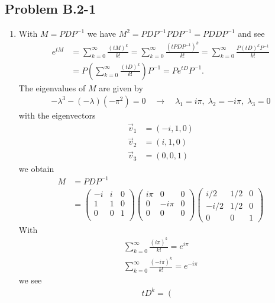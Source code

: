 \documentclass[10pt,a4paper]{book}
\theoremstyle{definition}
\begin{document}
\subsection{Problem B.2-1}
\begin{enumerate}
\item
With $M=PDP^{-1}$ we have $M^2=PDP^{-1}PDP^{-1}=PDDP^{-1}$ and see
\begin{align}
    e^{tM}&=\sum_{k=0}^\infty \frac{(tM)^k}{k!}=\sum_{k=0}^\infty \frac{(tPDP^{-1})^k}{k!}=\sum_{k=0}^\infty \frac{P(tD)^kP^{-1}}{k!}\\
    &=P\left(\sum_{k=0}^\infty \frac{(tD)^k}{k!}\right)P^{-1}=Pe^{tD}P^{-1}.
\end{align}
The eigenvalues of $M$ are given by
\begin{align}
    -\lambda^3-(-\lambda)(-\pi^2)=0\quad\rightarrow\quad\lambda_1=i\pi,\;\lambda_2=-i\pi,\;\lambda_3= 0
\end{align}
with the eigenvectors
\begin{align}
    \vec{v}_1&=(-i,1,0)\\
    \vec{v}_2&=(i,1,0)\\
    \vec{v}_3&=(0,0,1)
\end{align}
we obtain
\begin{align}
M&=PDP^{-1}\\
&=\left(
\begin{array}{ccc}
-i& i & 0 \\
1 & 1 & 0 \\
0 & 0 & 1 \\
\end{array}
\right)
\left(
\begin{array}{ccc}
 i\pi & 0 & 0 \\
 0 & -i\pi & 0 \\
 0 & 0 & 0 \\
\end{array}
\right)
\left(
\begin{array}{ccc}
  i/2 & 1/2 & 0 \\
 -i/2 & 1/2 & 0 \\
 0    & 0   & 1
\end{array}
\right)
\end{align}
With
\begin{align}
\sum_{k=0}^\infty \frac{(i\pi)^k}{k!}=e^{i\pi}\\
\sum_{k=0}^\infty \frac{(-i\pi)^k}{k!}=e^{-i\pi}
\end{align}
we see
\begin{align}
 tD^k=\left(
\begin{array}{ccc}

\end{array}
\end{align}
\end{enumerate}
\end{document}
